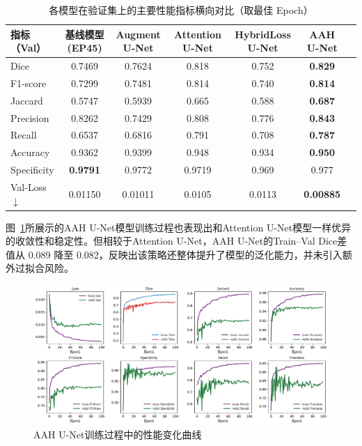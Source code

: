 \begin{table}[!htbp]
    \centering
    \caption{各模型在验证集上的主要性能指标横向对比（取最佳 Epoch）}
    \label{tab:model_summary}
    \begin{tabular}{lcccccc}
        \toprule
        指标（Val） & 基线模型(EP45) & Augment U-Net & Attention U-Net & HybridLoss U-Net & AAH U-Net \\
        \midrule
        Dice        & 0.7469 & 0.7624 & 0.818 & 0.752 & \textbf{0.829} \\
        F1-score    & 0.7299 & 0.7481 & 0.814 & 0.740 & \textbf{0.814} \\
        Jaccard     & 0.5747 & 0.5939 & 0.665 & 0.588 & \textbf{0.687} \\
        Precision   & 0.8262 & 0.7429 & 0.808 & 0.776 & \textbf{0.843} \\
        Recall      & 0.6537 & 0.6816 & 0.791 & 0.708 & \textbf{0.787} \\
        Accuracy    & 0.9362 & 0.9399 & 0.948 & 0.934 & \textbf{0.950} \\
        Specificity & \textbf{0.9791} & 0.9772 & 0.9719 & 0.969 & 0.977 \\
        Val-Loss $\downarrow$ & 0.01150 & 0.01011 & 0.0105 & 0.0113 & \textbf{0.00885} \\
        \bottomrule
    \end{tabular}
\end{table}

图~\ref{fig:all_in_is_art}所展示的AAH U-Net模型训练过程也表现出和Attention U-Net模型一样优异的收敛性和稳定性。但相较于Attention U-Net，AAH U-Net的Train–Val Dice差值从 0.089 降至 0.082，反映出该策略还整体提升了模型的泛化能力，并未引入额外过拟合风险。

\begin{figure}[!htbp]
    \centering
    \includegraphics[width=\textwidth]{fig/allin_unet_metrics.pdf}
    \caption{AAH U-Net训练过程中的性能变化曲线}
    \label{fig:all_in_is_art}
\end{figure}

